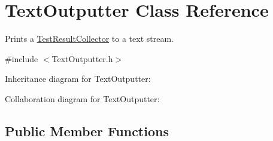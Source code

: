 \hypertarget{class_text_outputter}{\section{Text\+Outputter Class Reference}
\label{class_text_outputter}
}


Prints a \hyperlink{class_test_result_collector}{Test\+Result\+Collector} to a text stream.  




{\ttfamily \#include $<$Text\+Outputter.\+h$>$}



Inheritance diagram for Text\+Outputter\+:


Collaboration diagram for Text\+Outputter\+:
\subsection*{Public Member Functions}
